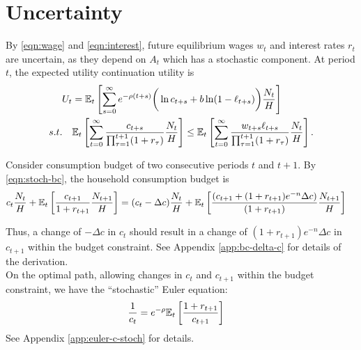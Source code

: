 \documentclass[../main.tex]{subfiles}
\begin{document}
    \section{Uncertainty}
    
        By  \eqref{eqn:wage} and \eqref{eqn:interest}, future equilibrium wages $w_t$ and interest rates $r_t$ are uncertain, as they depend on $A_t$ which has a stochastic component. At period $t$,
        the expected utility continuation utility is
        \begin{align}
            U_t &= \mathbb{E}_t\left[\sum_{s=0}^\infty e^{-\rho (t+s)}
            \bigg( \ln c_{t+s} + b \ln(1-\ell_{t+s}) \bigg)
            \frac{N_t}{H}\right]
            \label{eqn:stoch-utility}
            \\ s.t. \quad
             & \mathbb{E}_t\left[\sum_{t=0}^{\infty}
             \frac{c_{t+s}}{\prod_{\tau=1}^{{t+1}}(1+r_\tau)}
             \frac{N_t}{H}\right] \le
            \mathbb{E}_t\left[\sum_{t=0}^{\infty}
            \frac{w_{t+s} \ell_{t+s}}{\prod_{\tau=1}^{{t+1}}(1+r_\tau)}
            \frac{N_t}{H}\right].
            \label{eqn:stoch-bc}
        \end{align}
        
        Consider consumption budget of two consecutive periods $t$ and $t+1$. By \eqref{eqn:stoch-bc}, the household consumption budget is
        \begin{align}
            c_{t}\frac{N_{t}}{H} + \mathbb{E}_t\left[\frac{c_{t+1}}{1+r_{t+1}}\frac{N_{t+1}}{H}\right]
            &= (c_{t} - \Delta c)\frac{N_{t}}{H}
            + \mathbb{E}_t\left[\frac{(c_{t+1} + (1+r_{t+1})e^{-n}\Delta c)}{(1+r_{t+1})} \frac{N_{t+1}}{H}\right]
            \label{eqn:bc-delta-c}
        \end{align}
        
        Thus, a change of $-\Delta c$ in  $c_t$ should result in a change of $(1+r_{t+1}) e^{-n} \Delta c$ in $c_{t+1}$ within the budget constraint. See Appendix \ref{app:bc-delta-c} for details of the derivation. \\
        
        On the optimal path, allowing changes in $c_t$ and $c_{t+1}$ within the budget constraint, we have the ``stochastic'' Euler equation:
        \begin{align}
            \frac{1}{c_t}
            &= e^{-\rho} \mathbb{E}_t\left[\frac{1+r_{t+1}}{c_{t+1}}\right]
            \label{eqn:euler-c-stoch}
        \end{align}
        See Appendix \eqref{app:euler-c-stoch} for details.
    
\end{document}
